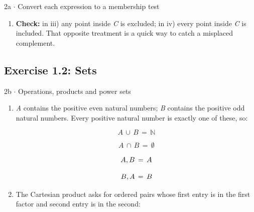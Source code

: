 \documentclass[11pt]{article}
\begin{document}
\begin{keepsection}
\begin{workedbox}{2a \ensuremath{\cdot} Convert each expression to a membership test}
\begin{enumerate}
\begin{equation*}(({A}\, \\, {C})\, \cup \, ({B}\, \\, {C}))^{\mathrm{c}}\, =\, (({A}\, \cup \, {B})\, \\, {C})^{\mathrm{c}}\, =\, ({A}\, \cup \, {B})^{\mathrm{c}}\, \cup \, {C}\end{equation*}
\item \textbf{Check:} in iii) any point inside \textit{C} is excluded; in iv) every point inside \textit{C} is included. That opposite treatment is a quick way to catch a misplaced complement.
\end{enumerate}
\end{workedbox}

\end{keepsection}
\begin{keepsection}\subsection{Exercise 1.2: Sets}

\begin{workedbox}{2b \ensuremath{\cdot} Operations, products and power sets}
\begin{enumerate}
\item {}
\textit{A} contains the positive even natural numbers; \textit{B} contains the positive odd natural numbers. Every positive natural number is exactly one of these, so:

\begin{equation*}{A}\, \cup \, {B}\, =\, \mathbb{N}\end{equation*}

\begin{equation*}{A}\, \cap \, {B}\, =\, \emptyset \end{equation*}

\begin{equation*}{A}\, \\, {B}\, =\, {A}\end{equation*}

\begin{equation*}{B}\, \\, {A}\, =\, {B}\end{equation*}
\item {}
The Cartesian product asks for ordered pairs whose first entry is in the first factor and second entry is in the second:


\end{enumerate}
\end{workedbox}
\end{keepsection}
\end{document}
